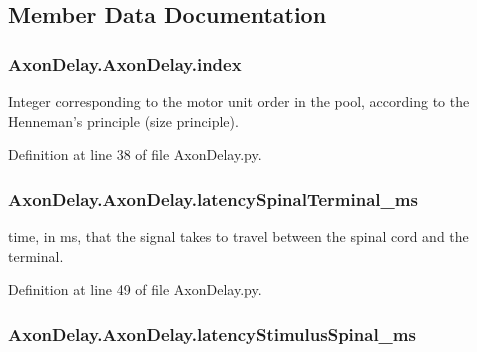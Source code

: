 \subsection{Member Data Documentation}
\hypertarget{class_axon_delay_1_1_axon_delay_a5dbb9b5002d4b54bf347f48337bdb1c6}{
\subsubsection[{index}]{\setlength{\rightskip}{0pt plus 5cm}Axon\-Delay.\-Axon\-Delay.\-index}}\label{class_axon_delay_1_1_axon_delay_a5dbb9b5002d4b54bf347f48337bdb1c6}


Integer corresponding to the motor unit order in the pool, according to the Henneman's principle (size principle). 



Definition at line 38 of file Axon\-Delay.\-py.

\hypertarget{class_axon_delay_1_1_axon_delay_aaa0b8daf2629cd7fa19d539fe2168d0f}{
\subsubsection[{latency\-Spinal\-Terminal\-\_\-ms}]{\setlength{\rightskip}{0pt plus 5cm}Axon\-Delay.\-Axon\-Delay.\-latency\-Spinal\-Terminal\-\_\-ms}}\label{class_axon_delay_1_1_axon_delay_aaa0b8daf2629cd7fa19d539fe2168d0f}


time, in ms, that the signal takes to travel between the spinal cord and the terminal. 



Definition at line 49 of file Axon\-Delay.\-py.

\hypertarget{class_axon_delay_1_1_axon_delay_a81ea09febed911b8f5e4d56a5f434f8d}{
\subsubsection[{latency\-Stimulus\-Spinal\-\_\-ms}]{\setlength{\rightskip}{0pt plus 5cm}Axon\-Delay.\-Axon\-Delay.\-latency\-Stimulus\-Spinal\-\_\-ms}}\label{class_axon_delay_1_1_axon_delay_a81ea09febed911b8f5e4d56a5f434f8d}


